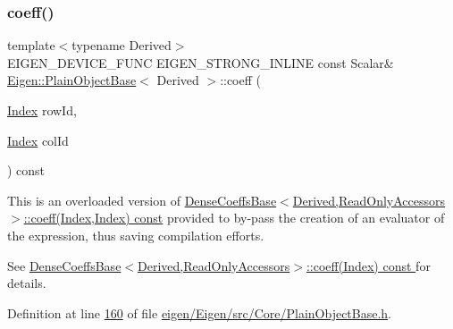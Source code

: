 \subsubsection{\texorpdfstring{coeff()}{coeff()}\hspace{0.1cm}{\footnotesize\ttfamily [1/4]}}
{\footnotesize\ttfamily template$<$typename Derived$>$ \\
E\+I\+G\+E\+N\+\_\+\+D\+E\+V\+I\+C\+E\+\_\+\+F\+U\+NC E\+I\+G\+E\+N\+\_\+\+S\+T\+R\+O\+N\+G\+\_\+\+I\+N\+L\+I\+NE const Scalar\& \hyperlink{class_eigen_1_1_plain_object_base}{Eigen\+::\+Plain\+Object\+Base}$<$ Derived $>$\+::coeff (\begin{DoxyParamCaption}\item[{\hyperlink{namespace_eigen_a62e77e0933482dafde8fe197d9a2cfde}{Index}}]{row\+Id,  }\item[{\hyperlink{namespace_eigen_a62e77e0933482dafde8fe197d9a2cfde}{Index}}]{col\+Id }\end{DoxyParamCaption}) const\hspace{0.3cm}{\ttfamily [inline]}}

This is an overloaded version of \hyperlink{group___core___module_ad41647ef695f9a5a58a9a0f50e2ae064}{Dense\+Coeffs\+Base$<$\+Derived,\+Read\+Only\+Accessors$>$\+::coeff(\+Index,\+Index) const} provided to by-\/pass the creation of an evaluator of the expression, thus saving compilation efforts.

See \hyperlink{group___core___module_ad52344ad1f42852db71996590d2de0de}{Dense\+Coeffs\+Base$<$\+Derived,\+Read\+Only\+Accessors$>$\+::coeff(\+Index) const }for details. 

Definition at line \hyperlink{eigen_2_eigen_2src_2_core_2_plain_object_base_8h_source_l00160}{160} of file \hyperlink{eigen_2_eigen_2src_2_core_2_plain_object_base_8h_source}{eigen/\+Eigen/src/\+Core/\+Plain\+Object\+Base.\+h}.

\mbox{\label{class_eigen_1_1_plain_object_base_afbfc12954f16d21aedb7bd839f64a278}} 
